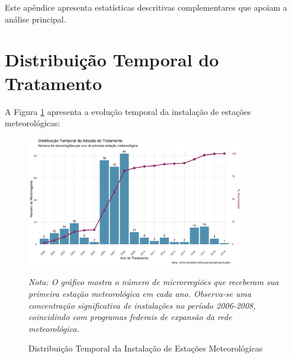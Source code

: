 \documentclass[
	12pt,				%
	oneside,			%
	a4paper,			%
	english,			%
	french,				%
	spanish,			%
	brazil				%
	]{abntex2}
\begin{document}
\begin{apendicesenv}
Este apêndice apresenta estatísticas descritivas complementares que apoiam a análise principal.

\section{Distribuição Temporal do Tratamento}

A Figura \ref{fig:dist_temporal} apresenta a evolução temporal da instalação de estações meteorológicas:

\begin{figure}[h]
\centering
\caption{Distribuição Temporal da Instalação de Estações Meteorológicas}
\label{fig:dist_temporal}
\includegraphics[width=0.85\textwidth]{../../../data/outputs/descriptive_analysis/distribuicao_temporal_tratamento.png}

\textit{Nota: O gráfico mostra o número de microrregiões que receberam sua primeira estação meteorológica em cada ano. Observa-se uma concentração significativa de instalações no período 2006-2008, coincidindo com programas federais de expansão da rede meteorológica.}
\end{figure}


\end{apendicesenv}
\end{document}
